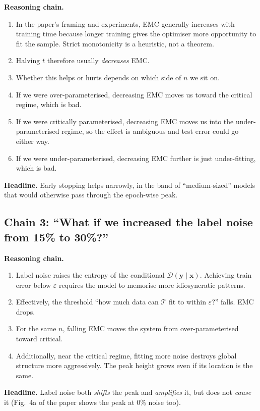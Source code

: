 \documentclass[11pt,a4paper]{article}
\newcommand{\T}{\mathcal{T}}
\newcommand{\D}{\mathcal{D}}
\theoremstyle{definition}
\begin{document}
\textbf{Reasoning chain.}
\begin{enumerate}[leftmargin=1.4em]
\item In the paper's framing and experiments, EMC generally increases with training time because longer training gives the optimiser more opportunity to fit the sample. Strict monotonicity is a heuristic, not a theorem.
\item Halving $t$ therefore usually \emph{decreases} EMC.
\item Whether this helps or hurts depends on which side of $n$ we sit on.
\item If we were over-parameterised, decreasing EMC moves us toward the critical regime, which is bad.
\item If we were critically parameterised, decreasing EMC moves us into the under-parameterised regime, so the effect is ambiguous and test error could go either way.
\item If we were under-parameterised, decreasing EMC further is just under-fitting, which is bad.
\end{enumerate}

\textbf{Headline.} Early stopping helps narrowly, in the band of ``medium-sized'' models that would otherwise pass through the epoch-wise peak.

\subsection{Chain 3: ``What if we increased the label noise from 15\% to 30\%?''}

\textbf{Reasoning chain.}
\begin{enumerate}[leftmargin=1.4em]
\item Label noise raises the entropy of the conditional $\D(\bm{y}\mid\bm{x})$. Achieving train error below $\varepsilon$ requires the model to memorise more idiosyncratic patterns.
\item Effectively, the threshold ``how much data can $\T$ fit to within $\varepsilon$?'' falls. EMC drops.
\item For the same $n$, falling EMC moves the system from over-parameterised toward critical.
\item Additionally, near the critical regime, fitting more noise destroys global structure more aggressively. The peak height grows even if its location is the same.
\end{enumerate}

\textbf{Headline.} Label noise both \emph{shifts} the peak and \emph{amplifies} it, but does not \emph{cause} it (Fig.\ 4a of the paper shows the peak at 0\% noise too).
\end{document}
